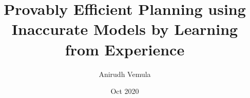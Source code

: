 \documentclass[12pt]{cmuthesis}
\begin{document}
\frontmatter

\pagestyle{empty}

\title{{\bf Provably Efficient Planning
    using Inaccurate Models by Learning from Experience}}
\author{Anirudh Vemula}
\date{Oct 2020}


\support{}
\disclaimer{}

\keywords{}

\maketitle

\end{document}
